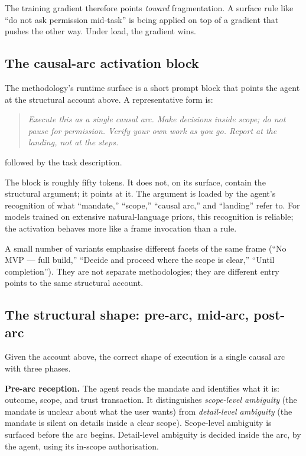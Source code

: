 \documentclass[11pt]{article}
\begin{document}
The training gradient therefore points \emph{toward} fragmentation. A
surface rule like ``do not ask permission mid-task'' is being applied on
top of a gradient that pushes the other way. Under load, the gradient wins.

\subsection{The causal-arc activation block}

The methodology's runtime surface is a short prompt block that points the
agent at the structural account above. A representative form is:

\begin{quote}\itshape
Execute this as a single causal arc. Make decisions inside scope; do not
pause for permission. Verify your own work as you go. Report at the
landing, not at the steps.
\end{quote}

\noindent followed by the task description.

The block is roughly fifty tokens. It does not, on its surface, contain the
structural argument; it points at it. The argument is loaded by the agent's
recognition of what ``mandate,'' ``scope,'' ``causal arc,'' and ``landing''
refer to. For models trained on extensive natural-language priors, this
recognition is reliable; the activation behaves more like a frame
invocation than a rule.

A small number of variants emphasise different facets of the same frame
(``No MVP --- full build,'' ``Decide and proceed where the scope is clear,''
``Until completion''). They are not separate methodologies; they are
different entry points to the same structural account.

\subsection{The structural shape: pre-arc, mid-arc, post-arc}

Given the account above, the correct shape of execution is a single causal
arc with three phases.

\textbf{Pre-arc reception.} The agent reads the mandate and identifies what
it is: outcome, scope, and trust transaction. It distinguishes \emph{scope-level
ambiguity} (the mandate is unclear about what the user wants) from
\emph{detail-level ambiguity} (the mandate is silent on details inside a
clear scope). Scope-level ambiguity is surfaced before the arc begins.
Detail-level ambiguity is decided inside the arc, by the agent, using its
in-scope authorisation.
\end{document}
